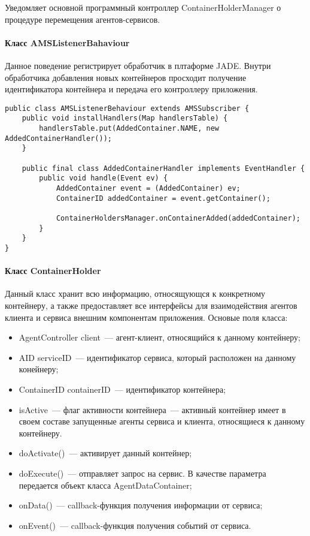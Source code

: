 Уведомляет основной программный контроллер ContainerHolderManager о процедуре перемещения агентов-сервисов.

\paragraph{Класс AMSListenerBahaviour}
Данное поведение регистрирует обработчик в плтаформе JADE. Внутри обработчика добавления новых контейнеров просходит получение идентификатора контейнера и передача его контроллеру приложения.
\begin{lstlisting}
public class AMSListenerBehaviour extends AMSSubscriber {
    public void installHandlers(Map handlersTable) {
        handlersTable.put(AddedContainer.NAME, new AddedContainerHandler());
    }

    public final class AddedContainerHandler implements EventHandler {
        public void handle(Event ev) {
            AddedContainer event = (AddedContainer) ev;
            ContainerID addedContainer = event.getContainer();

            ContainerHoldersManager.onContainerAdded(addedContainer);
        }
    }
}
\end{lstlisting}

\paragraph{Класс ContainerHolder}
Данный класс хранит всю информацию, относящующся к конкретному контейнеру, а также предоставляет все интерфейсы для взаимодействия агентов клиента и сервиса внешним компонентам приложения. Основые поля класса:

\begin{itemize}
\item AgentController client~--- агент-клиент, относящийся к данному контейнеру;
\item AID serviceID~--- идентификатор сервиса, который расположен на данному конейнеру;
\item ContainerID containerID~--- идентификатор контейнера;
\item isActive~--- флаг активности контейнера~--- активный контейнер имеет в своем составе запущенные агенты сервиса и клиента, относящиеся к данному контейнеру.
\end{itemize}

\begin{itemize}
\item doActivate()~--- активирует данный контейнер;
\item doExecute()~--- отправляет запрос на сервис. В качестве параметра передается объект класса AgentDataContainer;
\item onData()~--- callback-функция получения информации от сервиса;
\item onEvent()~--- callback-функция получения событий от сервиса.
\end{itemize}

